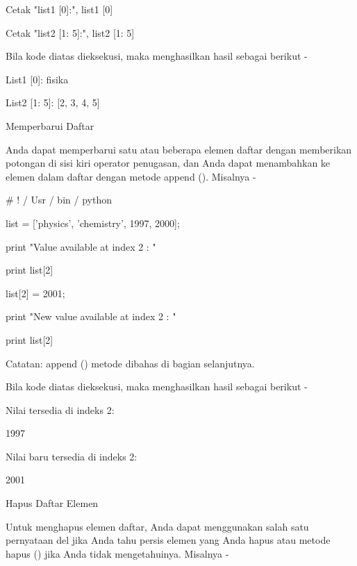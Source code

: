 Cetak "list1 [0]:", list1 [0] \par
Cetak "list2 [1: 5]:", list2 [1: 5] \par
\vspace{12pt}
Bila kode diatas dieksekusi, maka menghasilkan hasil sebagai berikut - \par
\vspace{12pt}
List1 [0]: fisika \par
List2 [1: 5]: [2, 3, 4, 5] \par
\vspace{12pt}
Memperbarui Daftar \par
\vspace{12pt}
Anda dapat memperbarui satu atau beberapa elemen daftar dengan memberikan potongan di sisi kiri operator penugasan, dan Anda dapat menambahkan ke elemen dalam daftar dengan metode append (). Misalnya - \par
\vspace{12pt}
   \#  ! / Usr / bin / python \par
\vspace{12pt}
list = ['physics', 'chemistry', 1997, 2000]; \par
\vspace{12pt}
print "Value available at index 2 : " \par
print list[2] \par
list[2] = 2001; \par
print "New value available at index 2 : " \par
print list[2] \par
Catatan: append () metode dibahas di bagian selanjutnya. \par
\vspace{12pt}
Bila kode diatas dieksekusi, maka menghasilkan hasil sebagai berikut - \par
Nilai tersedia di indeks 2: \par
\vspace{12pt}
1997 \par
\vspace{12pt}
Nilai baru tersedia di indeks 2: \par
\vspace{12pt}
2001 \par
\vspace{12pt}
Hapus Daftar Elemen \par
\vspace{12pt}
Untuk menghapus elemen daftar, Anda dapat menggunakan salah satu pernyataan del jika Anda tahu persis elemen yang Anda hapus atau metode hapus () jika Anda tidak mengetahuinya. Misalnya - \par
